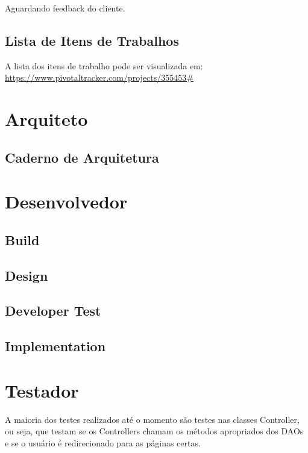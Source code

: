\documentclass[12pt,letterpaper]{article}
\begin{document}
Aguardando feedback do cliente.



\subsection{Lista de Itens de Trabalhos}

A lista dos itens de trabalho pode ser visualizada em: \url{https://www.pivotaltracker.com/projects/355453#}


\pagebreak
\section{Arquiteto}

\subsection{Caderno de Arquitetura}




\pagebreak
\section{Desenvolvedor}

\subsection{Build}
\subsection{Design}
\subsection{Developer Test}
\subsection{Implementation}





\pagebreak
\section{Testador}

A maioria dos testes realizados até o momento são testes nas classes Controller, ou seja, que testam se os Controllers chamam os métodos apropriados dos DAOs e se o usuário é redirecionado para as páginas certas. 
\end{document}
